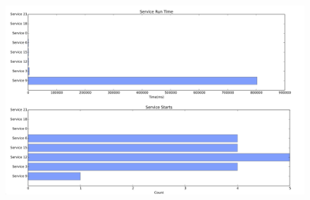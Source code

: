 \documentclass[a4paper,12pt]{article}
\begin{document}
\pagebreak
\begin{figure}[!h]
 	\begin{center}
		\includegraphics[scale=0.35]{reporter2}
	\end{center}
\end{figure}
\end{document}
